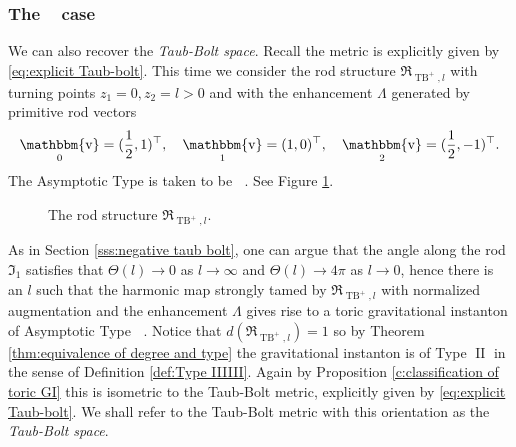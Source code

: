 \documentclass[a4paper,11pt]{amsart}
\theoremstyle{definition}
\numberwithin{equation}{section}
\newcommand{\mv} {\mathfrak v}
\newcommand{\mI} {\mathfrak I}
\newcommand{\mR} {\mathfrak R}
\DeclareMathOperator{\bbv}{\mathbbm{v}}
\DeclareMathOperator{\II}{II}
\DeclareMathOperator{\TB}{TB}
\DeclareMathOperator{\ALFp}{ALF^+}
\begin{document}
\subsubsection{The \texorpdfstring{$\ALFp$}{} case}
We can also recover the \emph{Taub-Bolt space}. Recall the metric is explicitly given by \eqref{eq:explicit Taub-bolt}. This time we consider the rod structure $\mR_{\TB^+,l}$ with turning points $z_1=0,z_2=l>0$ and with the enhancement $\Lambda$ generated by primitive rod vectors
$$\bbv_0=(\frac{1}{2},1)^\top,\quad \bbv_1=(1,0)^\top,\quad \bbv_2=(\frac{1}{2},-1)^\top.$$
The Asymptotic Type is taken to be $\ALFp$. See Figure \ref{Figure:positive taub-bolt}.
\begin{figure}[ht]
    \caption{The rod structure $\mR_{\TB^+,l}$.}
    \label{Figure:positive taub-bolt}
\end{figure}
As in Section \ref{sss:negative taub bolt}, one can argue that the angle along the rod $\mI_1$ satisfies that $\Theta(l)\to0$ as $l\to\infty$ and $\Theta(l)\to4\pi$ as $l\to0$, hence there is an $l$ such that the harmonic map strongly tamed by $\mR_{\TB^+,l}$ with normalized augmentation and the enhancement $\Lambda$ gives rise to a  toric gravitational instanton of Asymptotic Type $\ALFp$. Notice that $d(\mR_{\TB^+, l})=1$ so by Theorem \ref{thm:equivalence of degree and type} the gravitational instanton is of Type $\II$ in the sense of Definition \ref{def:Type IIIIII}. Again  by Proposition \ref{c:classification of toric GI} this is isometric to the Taub-Bolt metric, explicitly given by \eqref{eq:explicit Taub-bolt}. We shall refer to the Taub-Bolt metric with this orientation as the \emph{Taub-Bolt space}.
\end{document}
